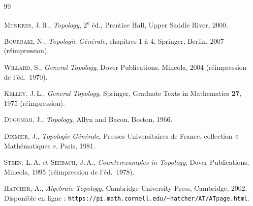 \documentclass[12pt,a4paper,openany]{book}
\theoremstyle{definition}
\theoremstyle{cours}
\theoremstyle{coursnormal}
\begin{document}
\begin{thebibliography}{99}

\textsc{Munkres}, J.\,R.,
\emph{Topology}, 2\textsuperscript{e} éd.,
Prentice Hall, Upper Saddle River, 2000.

\textsc{Bourbaki}, N.,
\emph{Topologie Générale}, chapitres 1 à 4,
Springer, Berlin, 2007 (réimpression).

\textsc{Willard}, S.,
\emph{General Topology},
Dover Publications, Mineola, 2004 (réimpression de l'éd.\ 1970).

\textsc{Kelley}, J.\,L.,
\emph{General Topology},
Springer, Graduate Texts in Mathematics \textbf{27}, 1975
(réimpression).

\textsc{Dugundji}, J.,
\emph{Topology},
Allyn and Bacon, Boston, 1966.

\textsc{Dixmier}, J.,
\emph{Topologie Générale},
Presses Universitaires de France, collection « Mathématiques »,
Paris, 1981.

\textsc{Steen}, L.\,A. et \textsc{Seebach}, J.\,A.,
\emph{Counterexamples in Topology},
Dover Publications, Mineola, 1995 (réimpression de l'éd.\ 1978).

\textsc{Hatcher}, A.,
\emph{Algebraic Topology},
Cambridge University Press, Cambridge, 2002.
Disponible en ligne : \texttt{https://pi.math.cornell.edu/\~{}hatcher/AT/ATpage.html}.

\end{thebibliography}

\printindex
\end{document}
